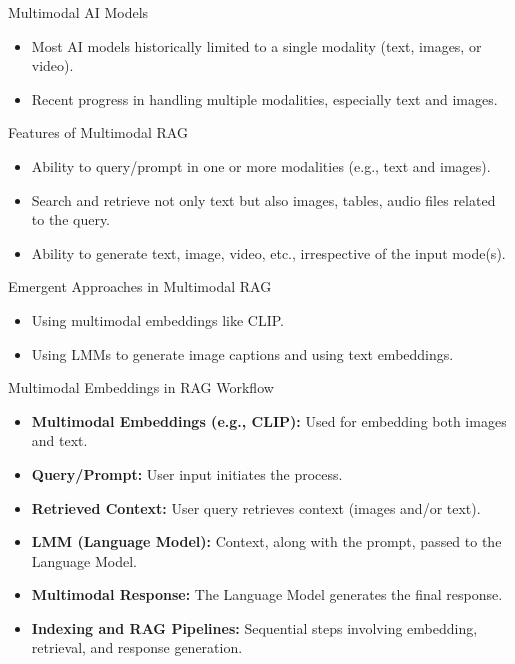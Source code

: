 \begin{frame}[fragile]{Multimodal AI Models}
    \begin{itemize}
        \item Most AI models historically limited to a single modality (text, images, or video).
        \item Recent progress in handling multiple modalities, especially text and images.
    \end{itemize}
\end{frame}

\begin{frame}[fragile]{Features of Multimodal RAG}
    \begin{itemize}
        \item Ability to query/prompt in one or more modalities (e.g., text and images).
        \item Search and retrieve not only text but also images, tables, audio files related to the query.
        \item Ability to generate text, image, video, etc., irrespective of the input mode(s).
    \end{itemize}
\end{frame}

\begin{frame}[fragile]{Emergent Approaches in Multimodal RAG}
    \begin{itemize}
        \item Using multimodal embeddings like CLIP.
        \item Using LMMs to generate image captions and using text embeddings.
    \end{itemize}
\end{frame}

\begin{frame}[fragile]{Multimodal Embeddings in RAG Workflow}
    \begin{itemize}
        \item \textbf{Multimodal Embeddings (e.g., CLIP):} Used for embedding both images and text.
        \item \textbf{Query/Prompt:} User input initiates the process.
        \item \textbf{Retrieved Context:} User query retrieves context (images and/or text).
        \item \textbf{LMM (Language Model):} Context, along with the prompt, passed to the Language Model.
        \item \textbf{Multimodal Response:} The Language Model generates the final response.
        \item \textbf{Indexing and RAG Pipelines:} Sequential steps involving embedding, retrieval, and response generation.
    \end{itemize}
\end{frame}



